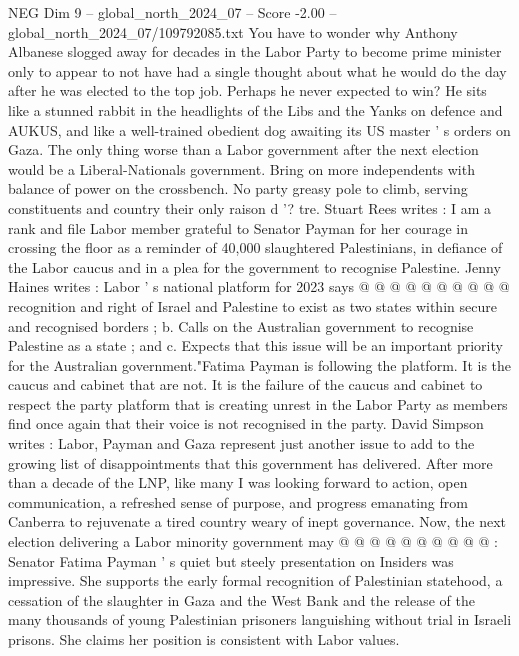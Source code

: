 \begin{textsample}{NEG Dim 9 – global\_north\_2024\_07 – Score -2.00 – global\_north\_2024\_07/109792085.txt}  \label{ex:f9_neg_138}
You have to wonder why Anthony Albanese slogged away for decades in the Labor Party to become prime minister only to appear to not have had a single thought about what he would do the day after he was elected to the top job.
Perhaps he never expected to win?
He sits like a stunned rabbit in the headlights of the Libs and the Yanks on defence and AUKUS, and like a well-trained obedient dog awaiting its US master ' s orders on Gaza.
The only thing worse than a Labor government after the next election would be a Liberal-Nationals government.
Bring on more independents with balance of power on the crossbench.
No party greasy pole to climb, serving constituents and country their only raison d '? tre.
Stuart Rees writes : I am a rank and file Labor member grateful to Senator Payman for her courage in crossing the floor as a reminder of 40,000 slaughtered Palestinians, in defiance of the Labor caucus and in a plea for the government to recognise Palestine.
Jenny Haines writes : Labor ' s national platform for 2023 says @ @ @ @ @ @ @ @ @ @ recognition and right of Israel and Palestine to exist as two states within secure and recognised borders ; b.
Calls on the Australian government to recognise Palestine as a state ; and c.
Expects that this issue will be an important priority for the Australian government."Fatima Payman is following the platform.
It is the caucus and cabinet that are not.
It is the failure of the caucus and cabinet to respect the party platform that is creating unrest in the Labor Party as members find once again that their voice is not recognised in the party.
David Simpson writes : Labor, Payman and Gaza represent just another issue to add to the growing list of disappointments that this government has delivered.
After more than a decade of the LNP, like many I was looking forward to action, open communication, a refreshed sense of purpose, and progress emanating from Canberra to rejuvenate a tired country weary of inept governance.
Now, the next election delivering a Labor minority government may @ @ @ @ @ @ @ @ @ @ : Senator Fatima Payman ' s quiet but steely presentation on Insiders was impressive.
She supports the early formal recognition of Palestinian statehood, a cessation of the slaughter in Gaza and the West Bank and the release of the many thousands of young Palestinian prisoners languishing without trial in Israeli prisons.
She claims her position is consistent with Labor values.

\end{textsample}
